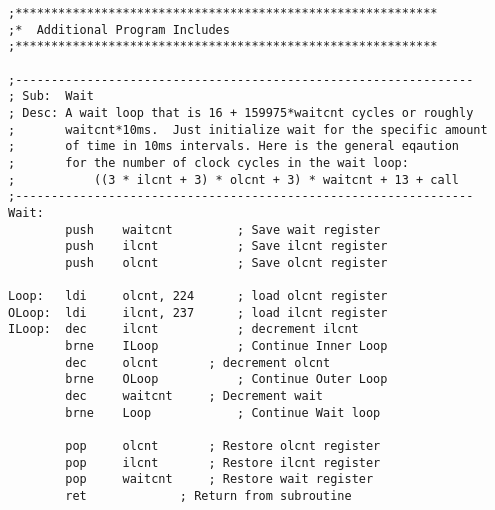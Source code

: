\documentclass[12pt,letterpaper]{article}
\begin{document}
\begin{verbatim}
;***********************************************************
;*	Additional Program Includes
;***********************************************************

;----------------------------------------------------------------
; Sub:	Wait
; Desc:	A wait loop that is 16 + 159975*waitcnt cycles or roughly
;		waitcnt*10ms.  Just initialize wait for the specific amount
;		of time in 10ms intervals. Here is the general eqaution
;		for the number of clock cycles in the wait loop:
;			((3 * ilcnt + 3) * olcnt + 3) * waitcnt + 13 + call
;----------------------------------------------------------------
Wait:
		push	waitcnt			; Save wait register
		push	ilcnt			; Save ilcnt register
		push	olcnt			; Save olcnt register

Loop:	ldi		olcnt, 224		; load olcnt register
OLoop:	ldi		ilcnt, 237		; load ilcnt register
ILoop:	dec		ilcnt			; decrement ilcnt
		brne	ILoop			; Continue Inner Loop
		dec		olcnt		; decrement olcnt
		brne	OLoop			; Continue Outer Loop
		dec		waitcnt		; Decrement wait
		brne	Loop			; Continue Wait loop

		pop		olcnt		; Restore olcnt register
		pop		ilcnt		; Restore ilcnt register
		pop		waitcnt		; Restore wait register
		ret				; Return from subroutine
\end{verbatim}
\end{document}
